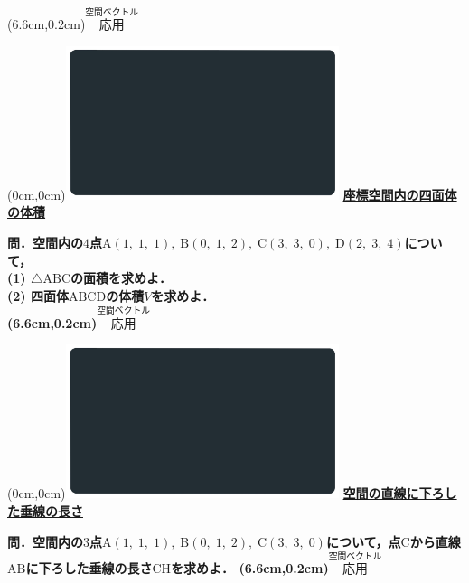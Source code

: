 \documentclass[10pt,
fleqn,
dvipdfmx,
uplatex
]{jsarticle}
\begin{document}
\at(6.6cm,0.2cm){\small\color{bradorange}$\overset{\text{空間ベクトル}}{\text{応用}}$}


\newpage



\at(0cm,0cm){\includegraphics[width=8cm,bb=0 0 1920 1080]{./youtube/thumbnails/templates/smart_background/空間ベクトル.jpeg}}
{\color{orange}\bf\boldmath\Large\underline{座標空間内の四面体の体積}}\vspace{0.3zw}

\large 
\bf\boldmath 問．空間内の$4$点$\text{A}\left(1,\;1,\;1\right),\;\text{B}\left(0,\;1,\;2\right),\;\text{C}\left(3,\;3,\;0\right),\;\text{D}\left(2,\;3,\;4\right)$について，\\
(1)  $\triangle \text{ABC}$の面積を求めよ．\\
(2)  四面体$\text{ABCD}$の体積$V$を求めよ．\\

\at(6.6cm,0.2cm){\small\color{bradorange}$\overset{\text{空間ベクトル}}{\text{応用}}$}


\newpage



\at(0cm,0cm){\includegraphics[width=8cm,bb=0 0 1920 1080]{./youtube/thumbnails/templates/smart_background/空間ベクトル.jpeg}}
{\color{orange}\bf\boldmath\large\underline{空間の直線に下ろした垂線の長さ}}\vspace{0.3zw}

\Large 
\bf\boldmath 問．空間内の$3$点$\text{A}\left(1,\;1,\;1\right),\;\text{B}\left(0,\;1,\;2\right),\;\text{C}\left(3,\;3,\;0\right)$について，点$\text{C}$から直線$\text{AB}$に下ろした垂線の長さ$\text{CH}$を求めよ．
\at(6.6cm,0.2cm){\small\color{bradorange}$\overset{\text{空間ベクトル}}{\text{応用}}$}
\end{document}
